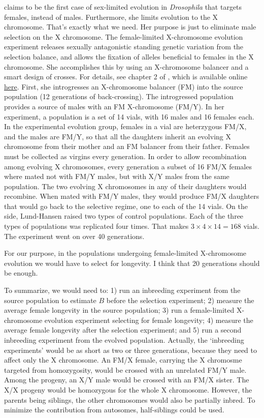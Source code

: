 \documentclass[a4paper,12pt]{article}
\begin{document}
\citet[p. 19]{Lund-Hansen2017} claims to be the first case of sex-limited evolution in \emph{Drosophila} that targets females, instead of males. Furthermore, she limits evolution to the X chromosome. That's exactly what we need. Her purpose is just to eliminate male selection on the X chromosome. The female-limited X-chromosome evolution experiment releases sexually antagonistic standing genetic variation from the selection balance, and allows the fixation of alleles beneficial to females in the X chromosome. She accomplishes this by using an X-chromosome balancer and a smart design of crosses. For details, see chapter 2 of \citet{Lund-Hansen2017}, which is available online \href{http://sro.sussex.ac.uk/70184/1/Lund-Hansen%2C%20Katrine%20Koch.pdf}{here}.
First, she introgresses an X-chromosome balancer (FM) into the source population (12 generations of back-crossing). The introgressed population provides a source of males with an FM X-chromosome (FM/Y). In her experiment, a population is a set of 14 vials, with 16 males and 16 females each. In the experimental evolution group, females in a vial are heterzygous FM/X, and the males are FM/Y, so that all the daughters inherit an evolving X chromosome from their mother and an FM balancer from their father. Females must be collected as virgins every generation. In order to allow recombination among evolving X chromosomes, every generation a subset of 16 FM/X females where mated not with FM/Y males, but with X/Y males from the same population. The two evolving X chromosomes in any of their daughters would recombine. When mated with FM/Y males, they would produce FM/X daughters that would go back to the selective regime, one to each of the 14 vials. On the side, Lund-Hansen raised two types of control populations. Each of the three types of populations was replicated four times. That makes $3\times 4 \times 14 = 168$ vials. The experiment went on over 40 generations.

For our purpose, in the populations undergoing female-limited X-chromosome evolution we would have to select for longevity. I think that 20 generations should be enough. 

To summarize, we would need to: 1) run an inbreeding experiment from the source population to estimate $B$ before the selection experiment; 2) measure the average female longevity in the source population; 3) run a female-limited X-chromosome evolution experiment selecting for female longevity; 4) measure the average female longevity after the selection experiment; and 5) run a second inbreeding experiment from the evolved population. Actually, the `inbreeding experiments' would be as short as two or three generations, because they need to affect only the X chromosome. An FM/X female, carrying the X chromosme targeted from homozygosity, would be crossed with an unrelated FM/Y male. Among the progeny, an X/Y male would be crossed with an FM/X sister. The X/X progeny would be homozygous for the whole X chromosome. However, the parents being siblings, the other chromosomes would also be partially inbred. To minimize the contribution from autosomes, half-siblings could be used.
\end{document}
